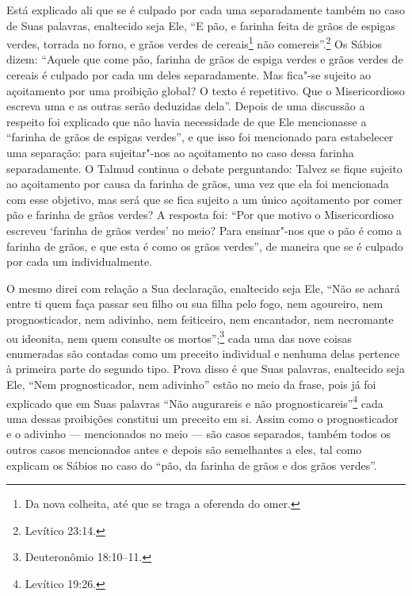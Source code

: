 Está explicado ali que se é culpado por cada uma separadamente também
no caso de Suas palavras, enaltecido seja Ele, ``E pão, e farinha feita
de grãos de espigas verdes, torrada no forno, e grãos verdes de
cereais\footnote{Da nova colheita, até que se traga a oferenda do omer\starr.} não comereis''.\footnote{Levítico 23:14.} Os Sábios
dizem: ``Aquele que come pão, farinha de grãos de espiga verdes e grãos
verdes de cereais é culpado por cada um deles separadamente. Mas
fica"-se sujeito ao açoitamento por uma proibição global? O texto é
repetitivo. Que o Misericordioso escreva uma e as outras serão deduzidas
dela''. Depois de uma discussão a respeito foi explicado que não havia
necessidade de que Ele mencionasse a ``farinha de grãos de espigas
verdes'', e que isso foi mencionado para estabelecer uma separação: para
sujeitar"-nos ao açoitamento no caso dessa farinha separadamente. O
Talmud\starr{} continua o debate perguntando: Talvez se fique sujeito ao
açoitamento por causa da farinha de grãos, uma vez que ela foi
mencionada com esse objetivo, mas será que se fica sujeito a um único
açoitamento por comer pão e farinha de grãos verdes? A resposta foi:
``Por que motivo o Misericordioso escreveu `farinha de grãos verdes' no
meio? Para ensinar"-nos que o pão é como a farinha de grãos, e que esta é
como os grãos verdes'', de maneira que se é culpado por cada um
individualmente.

O mesmo direi com relação a Sua declaração, enaltecido seja Ele, ``Não
se achará entre ti quem faça passar seu filho ou sua filha pelo fogo,
nem agoureiro, nem prognosticador, nem adivinho, nem feiticeiro, nem
encantador, nem necromante ou ideonita\starr, nem quem consulte os mortos'';\footnote{Deuteronômio 18:10--11.} cada uma das nove coisas enumeradas são
contadas como um preceito individual e nenhuma delas pertence à primeira
parte do segundo tipo. Prova disso é que Suas palavras, enaltecido seja
Ele, ``Nem prognosticador, nem adivinho'' estão no meio da frase, pois
já foi explicado que em Suas palavras ``Não augurareis e não
prognosticareis''\footnote{Levítico 19:26.} cada uma dessas proibições constitui
um preceito em si. Assim como o prognosticador e o adivinho ---
mencionados no meio --- são casos separados, também todos os outros
casos mencionados antes e depois são semelhantes a eles, tal como
explicam os Sábios no caso do ``pão, da farinha de grãos e dos grãos
verdes''.

